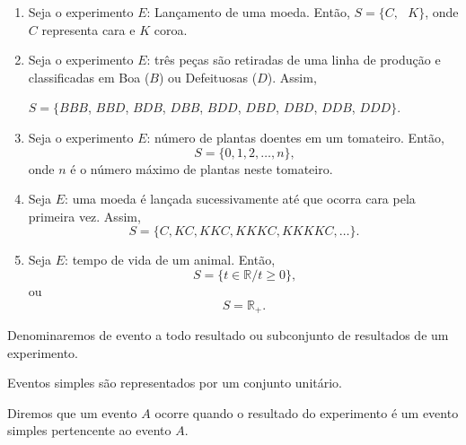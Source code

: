 \begin{pageWidthArea}
	\begin{example}
		\label{example:pecas_boas_defeituosas}
		\begin{multicols}{2}
			\begin{enumerate}\hfill
				\item Seja o experimento $E$: Lançamento de uma moeda. Então, $S=\{C,\text{ }K\}$, onde $C$ representa cara e $K$ coroa.
			
				\item Seja o experimento $E$: três peças são retiradas de uma linha de produção e classificadas em Boa ($B$) ou Defeituosas ($D$). Assim,
					\label{example:item:pecas_boas_defeituosas}
					\begin{center}
						\(S=\{BBB\), \(BBD\), \(BDB\), \(DBB\), \(BDD\), \(DBD\), \(DBD\), \(DDB\), \(DDD\}\).
					\end{center}
		
				\item Seja o experimento $E$: número de plantas doentes em um tomateiro. Então,
					\[
						S=\{0, 1, 2, \dots, n\}\text{,}
					\]
					onde $n$ é o número máximo de plantas neste tomateiro.
					
				\columnbreak
			
				\item Seja $E$: uma moeda é lançada sucessivamente até que ocorra cara pela primeira vez. Assim,
					\[
						S=\{C, KC, KKC, KKKC, KKKKC, \dots \}\text{.}
					\]
			
				\item Seja $E$: tempo de vida de um animal. Então,
					\[
						S=\{t\in\mathbb{R}/ t\geqslant 0\}\text{,}
					\]
					ou
					\[
						S=\mathbb{R}_{+}\text{.}
					\]
			\end{enumerate}
		\end{multicols}
	\end{example}
\end{pageWidthArea}

\begin{definition}
	Denominaremos de evento a todo resultado ou subconjunto de resultados de um experimento.
\end{definition}

\begin{remark}
	Eventos simples são representados por um conjunto unitário.
\end{remark}

\begin{remark}
	Diremos que um evento $A$ ocorre quando o resultado do experimento é um evento simples pertencente ao evento $A$.
\end{remark}

